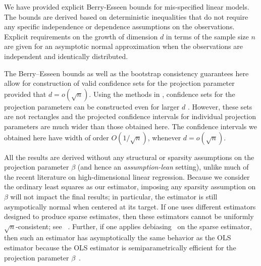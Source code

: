 \documentclass{article}
\begin{document}
 We have provided explicit Berry-Esseen bounds
 for mis-specified linear models. The bounds are
 derived based on deterministic inequalities that do not
 require any specific independence or dependence assumptions
 on the observations. 
 Explicit requirements on the growth of dimension $d$ 
 in terms of the sample size $n$ are given for an asymptotic
 normal approximation when the observations are independent
 and identically distributed. 
 
 
 The Berry--Esseen bounds as well as the bootstrap consistency guarantees here allow for construction of valid confidence sets
 for the projection parameter provided that $d = o(\sqrt{n})$. 
 Using the methods in
 \cite{kuchibhotla2018valid}, confidence sets for the projection parameters can be constructed even for larger $d$ .
 However, these sets are not rectangles and the projected
 confidence intervals for individual projection parameters 
 are much wider than those obtained here. The confidence 
 intervals we obtained here have width of order $O(1/\sqrt{n})$,
 whenever $d = o(\sqrt{n})$.
 
 All the results are derived without any structural or sparsity assumptions on the projection parameter $\beta$ (and hence an \emph{assumption-lean} setting), unlike much of the recent literature on high-dimensional linear regression. Because we consider the ordinary least squares as our estimator, imposing any sparsity assumption on $\beta$ will not impact the final results; in particular, the estimator is still asympotically normal when centered at its target. If one uses different estimators designed to produce sparse estimates, then these estimators cannot be uniformly $\sqrt{n}$-consistent; see ~\cite{potscher2009confidence}. Further, if one applies debiasing~\citep{javanmard2014confidence,vandegeer2014asymptotically,zhang2014confidence} on the sparse estimator, then such an estimator has asymptotically the same behavior as the OLS estimator because the OLS estimator is semiparametrically efficient for the projection parameter $\beta$~\cite{Levit76}. 
 
\end{document}
